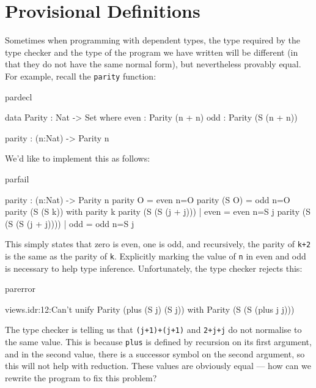 \section{Provisional Definitions}

Sometimes when programming with dependent types, the type required by the type
checker and the type of the program we have written will be different (in that
they do not have the same normal form), but nevertheless provably equal. For
example, recall the \texttt{parity} function:

\begin{SaveVerbatim}{pardecl}

data Parity : Nat -> Set where
   even : Parity (n + n)
   odd  : Parity (S (n + n))

parity : (n:Nat) -> Parity n

\end{SaveVerbatim}

\noindent
We'd like to implement this as follows:

\begin{SaveVerbatim}{parfail}

parity : (n:Nat) -> Parity n
parity O     = even {n=O}
parity (S O) = odd {n=O}
parity (S (S k)) with parity k {
  parity (S (S (j + j)))     | even = even {n=S j}
  parity (S (S (S (j + j)))) | odd  = odd {n=S j}
}

\end{SaveVerbatim}

\noindent
This simply states that zero is even, one is odd, and recursively, the parity
of \texttt{k+2} is the same as the parity of \texttt{k}. 
Explicitly marking the value of \texttt{n} in
even and odd is necessary to help type inference. Unfortunately, the type
checker rejects this:

\begin{SaveVerbatim}{parerror}

views.idr:12:Can't unify Parity (plus (S j) (S j)) with 
Parity (S (S (plus j j)))

\end{SaveVerbatim}

\noindent
The type checker
is telling us that \texttt{(j+1)+(j+1)} and \texttt{2+j+j}
do not normalise to the same value.
This is because \texttt{plus} is defined by recursion on its first argument, and in the
second value, there is a successor symbol on the second argument, so this will
not help with reduction. These values are obviously equal --- how can we rewrite
the program to fix this problem?

